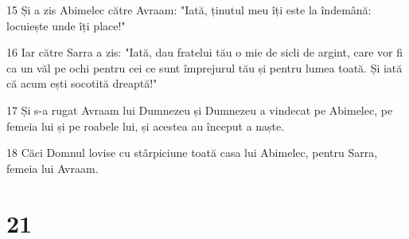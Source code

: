 \par 15 Și a zis Abimelec către Avraam: "Iată, ținutul meu îți este la îndemână: locuiește unde îți place!"
\par 16 Iar către Sarra a zis: "Iată, dau fratelui tău o mie de sicli de argint, care vor fi ca un văl pe ochi pentru cei ce sunt împrejurul tău și pentru lumea toată. Și iată că acum ești socotită dreaptă!"
\par 17 Și s-a rugat Avraam lui Dumnezeu și Dumnezeu a vindecat pe Abimelec, pe femeia lui și pe roabele lui, și acestea au început a naște.
\par 18 Căci Domnul lovise cu stârpiciune toată casa lui Abimelec, pentru Sarra, femeia lui Avraam.

\chapter{21}

